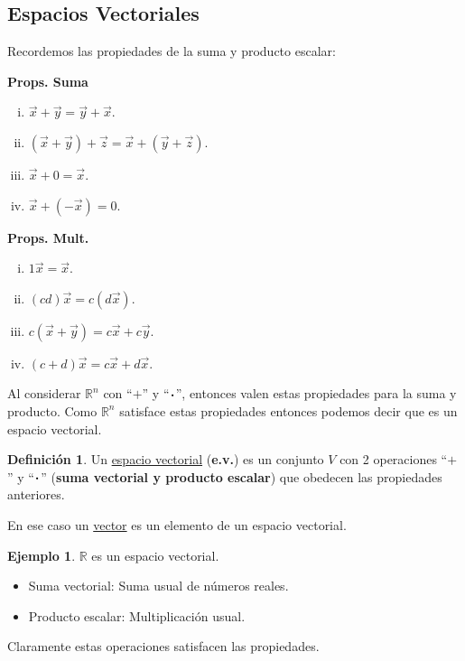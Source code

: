 \documentclass[12pt]{article}
\theoremstyle{plain}
\theoremstyle{definition}
\newtheorem*{Def}{Definición}       %
\newtheorem{Ex}[Th]{Ejemplo}           %
\theoremstyle{remark}
\newcommand{\bR}{\mathbb{R}}        %
\renewcommand{\:}{\colon}           %
\newcommand{\un}[1]{\underline{#1}}
\renewcommand{\.}{\Cdot}                %
\begin{document}
\begin{multicols}{2}
\subsection*{Espacios Vectoriales}

Recordemos las propiedades de la suma y producto escalar:

\begin{multicols}{2}
  \textbf{Props. Suma}
  \begin{enumerate}[i)]
    \itemsep=-0.4em
    \item $\vec{x}+\vec{y}=\vec{y}+\vec x$.
    \item {\footnotesize{$(\vec{x}+\vec y)+\vec z=\vec x+(\vec y+\vec z)$.}}
    \item $\vec x+0=\vec x$.
    \item $\vec x+(-\vec x)=0$.
  \end{enumerate}
  \textbf{Props. Mult.}
  \begin{enumerate}[i)]
    \itemsep=-0.4em
    \item $1\vec{x}=\vec x$.
    \item $(cd)\vec x=c(d\vec x)$.
    \item $c(\vec x+\vec y)=c\vec x+c\vec y$.
    \item $(c+d)\vec x=c\vec x+d\vec x$.
  \end{enumerate}
\end{multicols}

Al considerar $\bR^n$ con ``$+$'' y ``$\.$'', entonces valen estas propiedades para la suma y producto. Como $\bR^n$ satisface estas propiedades entonces podemos decir que es un espacio vectorial.

\begin{Def}
Un \un{espacio vectorial} (\textbf{e.v.}) es un conjunto $V$ con 2 operaciones ``$+$'' y ``$\.$'' (\textbf{suma vectorial y producto escalar}) que obedecen las propiedades anteriores.\par 
En ese caso un \un{vector} es un elemento de un espacio vectorial.
\end{Def}

\begin{Ex}
  $\bR$ es un espacio vectorial.
  \begin{itemize}
    \itemsep=-0.4em
    \item Suma vectorial: Suma usual de números reales.
    \item Producto escalar: Multiplicación usual.
  \end{itemize}
  Claramente estas operaciones satisfacen las propiedades.
\end{Ex}


\end{multicols}
\end{document}
